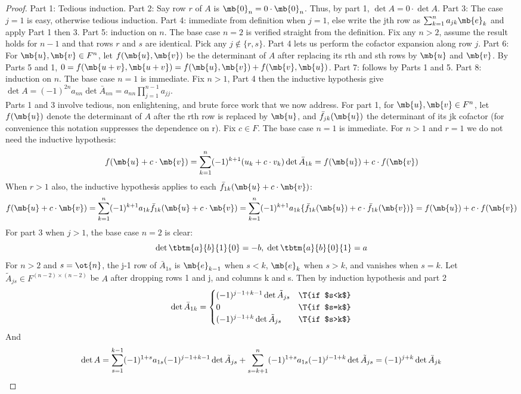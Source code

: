 \begin{proof}%
Part 1: Tedious induction.
Part 2: Say row $r$ of $A$ is $\mb{0}_n=0 \cdot \mb{0}_n$. Thus, by part 1, $\det A=0 \cdot \det A$.
Part 3: The case $j=1$ is easy, otherwise tedious induction.
Part 4: immediate from definition when $j=1$, else write the jth row as $\sum_{k=1}^na_{jk}\mb{e}_k$ and apply Part 1 then 3.
Part 5: induction on $n$. The base case $n=2$ is verified straight from the definition. Fix any $n>2$, assume the result holds for $n-1$ and that rows $r$ and $s$ are identical. Pick any $j \notin \{ r,s \}$. Part 4 lets us perform the cofactor expansion along row $j$.
Part 6: For $\mb{u}, \mb{v}\in F^n$, let $f(\mb{u}, \mb{v})$ be the determinant of $A$ after replacing its rth and sth rows by $\mb{u}$ and $\mb{v}$. By Parts 5 and 1, $0=f(\mb{u+v}, \mb{u+v})=f(\mb{u}, \mb{v})+f(\mb{v}, \mb{u})$.
Part 7: follows by Parts 1 and 5.
Part 8: induction on $n$. The base case $n=1$ is immediate. Fix $n>1$, Part 4 then the inductive hypothesis give $\det A=(-1)^{2n}a_{nn}\det \bar{A}_{nn}=a_{nn}\prod_{j=1}^{n-1}a_{jj}$.\\
Parts 1 and 3 involve tedious, non enlightening, and brute force work that we now address.
For part 1, for $\mb{u},\mb{v}\in F^n$, let $f( \mb{u})$ denote the determinant of $A$ after the rth row is replaced by $\mb{u}$, and $\bar{f}_{jk}( \mb{u})$ the determinant of its jk cofactor (for convenience this notation suppresses the dependence on r).
Fix $c \in F$. The base case $n=1$ is immediate. For $n>1$ and $r=1$ we do not need the inductive hypothesis:
\[ f( \mb{u}+c \cdot\mb{v})= \sum_{k=1}^n(-1)^{k+1}(u_k+c \cdot v_k)\det \bar{A}_{1k}= f( \mb{u})+c \cdot f( \mb{v})\]
When $r>1$ also, the inductive hypothesis applies to each $\bar{f}_{1k}( \mb{u}+c \cdot\mb{v})$:
\[ f( \mb{u}+c \cdot\mb{v})= \sum_{k=1}^n(-1)^{k+1}a_{1k}\bar{f}_{1k}( \mb{u}+c \cdot\mb{v})= \sum_{k=1}^n(-1)^{k+1}a_{1k}\{ \bar{f}_{1k}( \mb{u})+c \cdot \bar{f}_{1k}( \mb{v}) \}= f( \mb{u})+c \cdot f( \mb{v})\]
For part 3 when $j>1$, the base case $n=2$ is clear:
\[ \det \tbtm{a}{b}{1}{0}=-b, \; \det \tbtm{a}{b}{0}{1}=a \]
For $n>2$ and $s= \ot{n}$, the j-1 row of $\bar{A}_{1s}$ is $\mb{e}_{k-1}$ when $s<k$, $\mb{e}_k$ when $s>k$, and vanishes when $s=k$.
Let $\tilde{A}_{js}\in F^{(n-2) \times (n-2)}$ be $A$ after dropping rows 1 and j, and columns k and s. Then by induction hypothesis and part 2
\[ \det \bar{A}_{1k}= \begin{cases}(-1)^{j-1+k-1}\det \tilde{A}_{js}& \T{if $s<k$}\\
0 & \T{if $s=k$}\\
(-1)^{j-1+k}\det \tilde{A}_{js}& \T{if $s>k$}
\end{cases}\]
And
\[ \det A= \sum_{s=1}^{k-1}(-1)^{1+s}a_{1s}(-1)^{j-1+k-1}\det \tilde{A}_{js}+ \sum_{s=k+1}^n(-1)^{1+s}a_{1s}(-1)^{j-1+k}\det \tilde{A}_{js} =(-1)^{j+k}\det \bar{A}_{jk}\qedhere \]
\end{proof}

